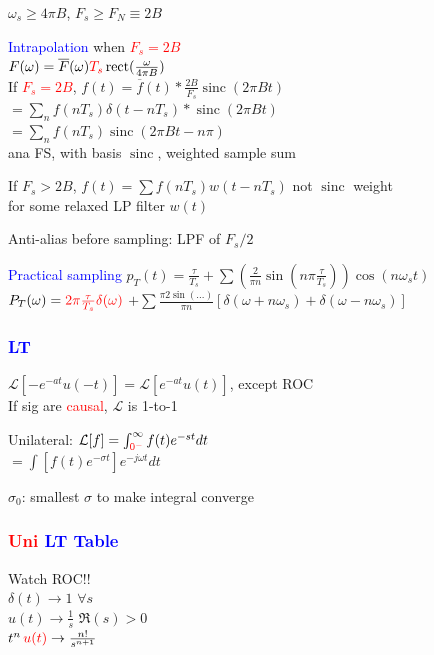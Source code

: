 \documentclass[4pt]{article}
\theoremstyle{definition}
\theoremstyle{definition}
\renewcommand{\o}{\omega}
\newcommand{\ra}{\rightarrow}
\DeclareMathOperator{\rect}{rect}
\DeclareMathOperator{\sinc}{sinc}
\newcommand{\red}[1]{\textcolor{red}{#1}}
\newcommand{\blue}[1]{\textcolor{blue}{#1}}
\begin{document}
\begin{landscape}
\begin{multicols}{3}
    $\o_s \geq 4\pi B$, $F_s \geq F_N \equiv 2B$

    \blue{Intrapolation} when \red{$F_s = 2B$}\\
    \(F(\o) = \overline{F}(\o) \red{T_s} \rect(\frac{\o}{4\pi B})\)\\  
    If \red{$F_s = 2B$}, \(f(t) = \overline{f}(t) * \frac{2B}{F_s} \sinc(2\pi Bt)\)\\       %
        \hspace{1em} \(=\sum_n f(nT_s)\delta(t - nT_s) * \sinc(2\pi B t)\)\\
        \hspace{1em} \(= \sum_n f(nT_s) \sinc(2\pi Bt - n\pi)\)\\
    ana FS, with basis $\sinc$, weighted sample sum

    If $F_s > 2B$, \(f(t) = \sum f(nT_s) w(t - nT_s)\)          \hfill not $\sinc$ weight\\
    for some relaxed LP filter $w(t)$

    Anti-alias before sampling: LPF of $F_s/2$

    \blue{Practical sampling} \(p_T(t) = \frac{\tau}{T_s} + \sum(\frac{2}{\pi n}\sin(n\pi\frac{\tau}{T_s}))\cos(n\omega_s t)\)\\
    \(P_T(\o) = \red{2\pi \frac{\tau}{T_s}\delta(\o)}\)
    \(+ \sum\frac{\pi 2\sin(...)}{\pi n}[\delta(\o + n\o_s) + \delta(\o - n\o_s)]\)       %
\subsubsection*{\blue{LT}}
    \(\mathcal L [-e^{-at}u(-t)] = \mathcal L [e^{-at} u(t)]\), except ROC\\
    If sig are \red{causal}, $\mathcal L$ is 1-to-1           

    Unilateral: \(\mathcal{L}[f] = \int_{\red{0^-}}^{\infty} f(t) e^{-st} dt\)\\          
        \hspace{1em} \(= \int [f(t) e^{-\sigma t}] e^{-j\o t} dt\)

    $\sigma_0$: smallest $\sigma$ to make integral converge
\subsubsection*{\blue{\red{Uni} LT Table}}
    Watch ROC!!\\                                   %
    $\delta(t) \ra 1$           \hfill $\forall s$\\          %
    $u(t) \ra \frac{1}{s}$      \hfill $\Re(s) > 0$\\
    $t^n \, \red{u(t)} \ra \frac{n!}{s^{n+1}}$               


\end{multicols}
\end{landscape}
\end{document}
